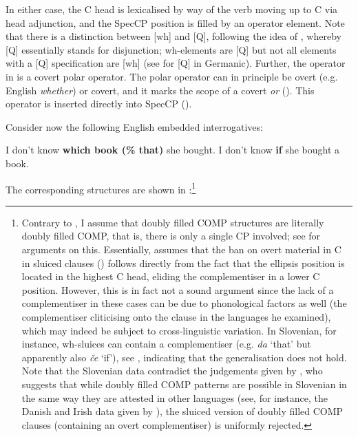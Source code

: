 \documentclass[output=paper,
modfonts, hidelinks, newtxmath
]{langscibook}
\begin{document}
\noindent In either case, the C head is lexicalised by way of the verb moving up to C via head adjunction, and the SpecCP position is filled by an operator element. Note that there is a distinction between [wh] and [Q], following the idea of \citet{bayer2004}, whereby [Q] essentially stands for disjunction; wh-elements are [Q] but not all elements with a [Q] specification are [wh] (see \citealt{bacskaiatkaritoappear} for [Q] in Germanic). Further, the operator in  is a covert polar operator. The polar operator can in principle be overt (e.g. English \textit{whether}) or covert, and it marks the scope of a covert \textit{or} (\citealt{larson1985}). This operator is inserted directly into SpecCP (\citealt{bianchicruschina2016}).

Consider now the following English embedded interrogatives:

\ea
	\ea I don't know \textbf{which book (\% that)} she bought. 
	\ex I don't know \textbf{if} she bought a book.
	\z
\z

\noindent The corresponding structures are shown in :\footnote{Contrary to \citet{baltin2010}, I assume that doubly filled COMP structures are literally doubly filled COMP, that is, there is only a single CP involved; see \citet{bacskaiatkari2018sardis} for arguments on this. Essentially, \citet{baltin2010} assumes that the ban on overt material in C in sluiced clauses (\citealt{merchant2001}) follows directly from the fact that the ellipsis position is located in the highest C head, eliding the complementiser in a lower C position. However, this is in fact not a sound argument since the lack of a complementiser in these cases can be due to phonological factors as well (the complementiser cliticising onto the clause in the languages he examined), which may indeed be subject to cross-linguistic variation. In Slovenian, for instance, wh-sluices can contain a complementiser (e.g. \textit{da} `that' but apparently also \textit{\v{c}e} `if'), see \citet{marusicmismasplesnicarrazborseksuligoj2015}, indicating that the generalisation does not hold. Note that the Slovenian data contradict the judgements given by \citet[76]{merchant2001}, who suggests that while doubly filled COMP patterns are possible in Slovenian in the same way they are attested in other languages (see, for instance, the Danish and Irish data given by \citealt[76--77]{merchant2001}), the sluiced version of doubly filled COMP clauses (containing an overt complementiser) is uniformly rejected.}
\end{document}
